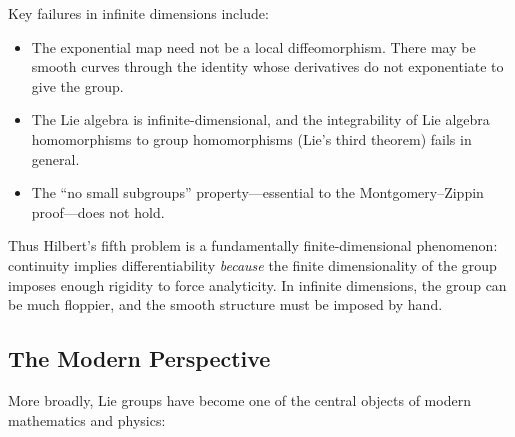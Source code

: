 Key failures in infinite dimensions include:
\begin{itemize}
    \item The exponential map need not be a local diffeomorphism. There may be smooth curves through the identity whose derivatives do not exponentiate to give the group.
    \item The Lie algebra is infinite-dimensional, and the integrability of Lie algebra homomorphisms to group homomorphisms (Lie's third theorem) fails in general.
    \item The ``no small subgroups'' property---essential to the Montgomery--Zippin proof---does not hold.
\end{itemize}

Thus Hilbert's fifth problem is a fundamentally finite-dimensional phenomenon: continuity implies differentiability \emph{because} the finite dimensionality of the group imposes enough rigidity to force analyticity. In infinite dimensions, the group can be much floppier, and the smooth structure must be imposed by hand.

\subsection{The Modern Perspective}

More broadly, Lie groups have become one of the central objects of modern mathematics and physics:

